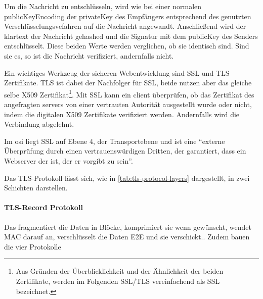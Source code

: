 Um die Nachricht zu entschlüsseln, wird wie bei einer normalen \gls{publicKeyEncoding} der \gls{privateKey} des Empfängers entsprechend des genutzten Verschlüsselungsvefahren auf die Nachricht angewandt. Anschließend wird der \gls{klartext} der Nachricht gehashed und die Signatur mit dem \gls{publicKey} des Senders entschlüsselt. Diese beiden Werte werden verglichen, ob sie identisch sind. Sind sie es, so ist die Nachricht verifiziert, andernfalls nicht.\autocite[\pagef~297]{6391693}

Ein wichtiges Werkzeug der sicheren Webentwicklung sind \ac{SSL} und \ac{TLS} Zertifikate. \ac{TLS} ist dabei der Nachfolger für \ac{SSL}, beide nutzen aber das gleiche selbe \gls{X509} Zertifikat\footnote{Aus Gründen der Überblicklichkeit und der Ähnlichkeit der beiden Zertifikate, werden im Folgenden \ac{SSL}/\ac{TLS} vereinfachend als \ac{SSL} bezeichnet.}. Mit \ac{SSL} kann ein \gls{client} überprüfen, ob das Zertifikat des angefragten \glspl{server} von einer vertrauten Autorität ausgestellt wurde oder nicht, indem die digitalen \gls{X509} Zertifikate verifiziert werden. Andernfalls wird die Verbindung abgelehnt.\autocite[\pagef~1]{zhang_analysis_2014}

Im \gls{osi} liegt \ac{SSL} auf Ebene 4, der Transportebene\autocite{HowTLSSS99:online} und ist eine \enquote{externe Überprüfung durch einen vertrauenswürdigen Dritten, der garantiert, dass ein Webserver der ist, der er vorgibt zu sein}\autocite[Grund Nr. 3]{CloudfareWarumHTTPS:online}.

Das \ac{TLS}-Protokoll lässt sich, wie in \autoref{tab:tls-protocol-layers} dargestellt, in zwei Schichten darstellen.

\begin{table}[htpb]
\caption{TLS-Protokoll Schichten}
\label{tab:tls-protocol-layers}
\end{table}

\paragraph[TLS-Record Protocol]{\ac{TLS}-Record Protokoll}\label{par:tls_record_protocol}
Das  fragmentiert die Daten in Blöcke, komprimiert sie wenn gewünscht, wendet \ac{MAC} darauf an, verschlüsselt die Daten \ac{E2E} und sie verschickt.\autocite[\vglf][]{Transpor18:online}. Zudem bauen die vier Protokolle 

